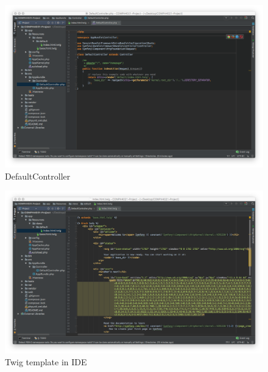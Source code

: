 \begin{figure}[htbp]
   \centering
   \includegraphics[width=400pt]{figures/default_controller.png} %
   \caption{DefaultController}
   \label{fig:DefaultController}
\end{figure}

\begin{figure}[htbp]
   \centering
   \includegraphics[width=400pt]{figures/twig_index.png} %
   \caption{Twig template in IDE}
   \label{fig:Twig template in IDE}
\end{figure}

